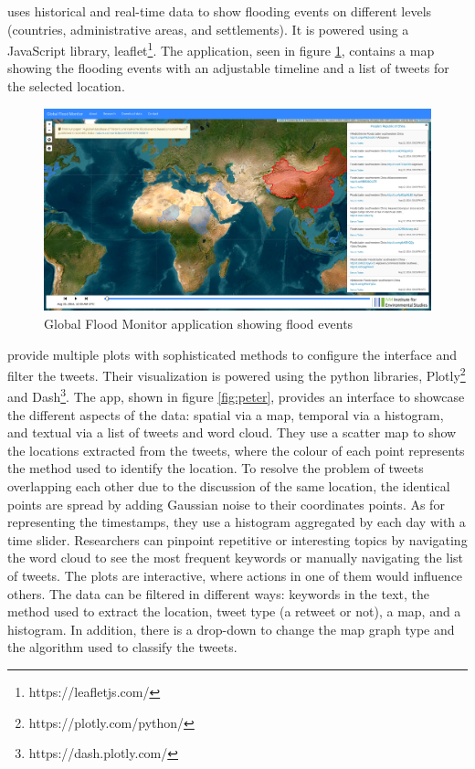  uses historical and real-time data to show flooding
events on different levels (countries, administrative areas, and settlements). It is powered using a
JavaScript library, leaflet\footnote{https://leafletjs.com/}. The application, seen in figure
\ref{fig:global}, contains a map showing the flooding events with an adjustable timeline and a list
of tweets for the selected location.


\begin{figure}[H]
\begin{center}
  \includegraphics[width=\columnwidth]{images/global.png}
\end{center}
\caption{Global Flood Monitor application showing flood events}
\label{fig:global}
\end{figure}

 provide multiple plots with sophisticated
methods to configure the interface and filter the tweets. Their visualization is powered using the python
libraries, Plotly\footnote{https://plotly.com/python/} and Dash\footnote{https://dash.plotly.com/}.
The app, shown in figure \ref{fig:peter}, provides an interface to showcase the different aspects of the
data: spatial via a map, temporal via a histogram, and textual via a list of tweets and word cloud.
They use a scatter map to show the locations extracted from the tweets, where the colour of each
point represents the method used to identify the location. To resolve the problem of tweets
overlapping each other due to the discussion of the same location, the identical points are
spread by adding Gaussian noise to their coordinates points. As for representing the timestamps,
they use a histogram aggregated by each day with a time slider. Researchers can pinpoint repetitive
or interesting topics by navigating the word cloud to see the most frequent keywords or manually
navigating the list of tweets. The plots are interactive, where actions in one of them would
influence others. The data can be filtered in different ways: keywords in the text, the method used
to extract the location, tweet type (a retweet or not), a map, and a histogram. In addition, there is a
drop-down to change the map graph type and the algorithm used to classify the tweets.

